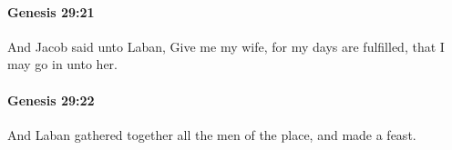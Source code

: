 		\paragraph{Genesis 29:21} %
			\label{GENESIS-29-21}

			And Jacob said unto Laban, Give me my wife, for my days are fulfilled, that I may go in unto her.


		\paragraph{Genesis 29:22} %
			\label{GENESIS-29-22}

			And Laban gathered together all the men of the place, and made a feast.


